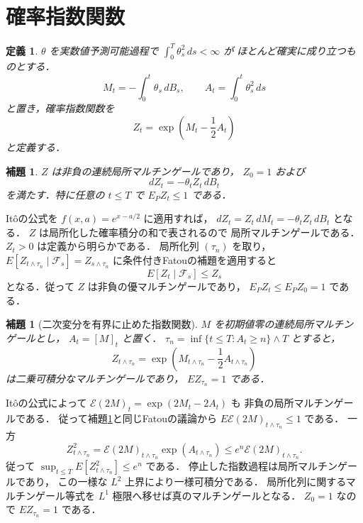 \documentclass[a5paper,10pt,onecolumn]{jsarticle}
\makeatletter
\theoremstyle{mathnotetheorem}
\newtheorem{definition}[theorem]{定義}
\newtheorem{lemma}[theorem]{補題}
\renewcommand{\proofname}{証明}
\renewenvironment{proof}[1][\proofname]{%
  \par\pushQED{\qed}\normalfont\topsep4\p@\@plus2\p@\relax
  \trivlist\item[\hskip\labelsep\bfseries #1]\ignorespaces
}{\popQED\endtrivlist\@endpefalse}
\makeatother
\begin{document}
\section{確率指数関数}

\begin{definition}
$\theta$ を実数値予測可能過程で
$\int_0^T\theta_s^2\,ds<\infty$ が
ほとんど確実に成り立つものとする．
\[
 M_t=-\int_0^t\theta_s\,dB_s,\qquad
 A_t=\int_0^t\theta_s^2\,ds
\]
と置き，\emph{確率指数関数}を
\[
 Z_t=\exp\!\left(M_t-\frac12A_t\right)
\]
と定義する．
\end{definition}

\begin{lemma}\label{lem:positive-local}
$Z$ は非負の連続局所マルチンゲールであり，
$Z_0=1$ および
\[
 dZ_t=-\theta_tZ_t\,dB_t
\]
を満たす．特に任意の $t\le T$ で $E_PZ_t\le1$ である．
\end{lemma}
\begin{proof}
It\^oの公式を $f(x,a)=e^{x-a/2}$ に適用すれば，
$dZ_t=Z_t\,dM_t=-\theta_tZ_t\,dB_t$ となる．
$Z$ は局所化した確率積分の和で表されるので
局所マルチンゲールである．
$Z_t>0$ は定義から明らかである．
局所化列 $(\tau_n)$ を取り，
$E[Z_{t\wedge\tau_n}\mid\mathcal F_s]
 =Z_{s\wedge\tau_n}$ に条件付きFatouの補題を適用すると
\[
 E[Z_t\mid\mathcal F_s]\le Z_s
\]
となる．従って $Z$ は非負の優マルチンゲールであり，
$E_PZ_t\le E_PZ_0=1$ である．
\end{proof}

\begin{lemma}[二次変分を有界に止めた指数関数]
\label{lem:stop-exponential}
$M$ を初期値零の連続局所マルチンゲールとし，
$A_t=[M]_t$ と置く．
$\tau_n=\inf\{t\le T:A_t\ge n\}\wedge T$ とすると，
\[
 Z_{t\wedge\tau_n}
 =\exp\!\left(M_{t\wedge\tau_n}
              -\frac12A_{t\wedge\tau_n}\right)
\]
は二乗可積分なマルチンゲールであり，
$E Z_{\tau_n}=1$ である．
\end{lemma}
\begin{proof}
It\^oの公式によって
$\mathcal E(2M)_t=\exp(2M_t-2A_t)$ も
非負の局所マルチンゲールである．
従って補題\ref{lem:positive-local}と同じFatouの議論から
$E\mathcal E(2M)_{t\wedge\tau_n}\le1$ である．
一方
\[
 Z_{t\wedge\tau_n}^2
 =\mathcal E(2M)_{t\wedge\tau_n}
   \exp(A_{t\wedge\tau_n})
 \le e^n\mathcal E(2M)_{t\wedge\tau_n}.
\]
従って
$\sup_{t\le T}E[Z_{t\wedge\tau_n}^2]\le e^n$ である．
停止した指数過程は局所マルチンゲールであり，
この一様な $L^2$ 上界により一様可積分である．
局所化列に関するマルチンゲール等式を
$L^1$ 極限へ移せば真のマルチンゲールとなる．
$Z_0=1$ なので $EZ_{\tau_n}=1$ である．
\end{proof}
\end{document}
